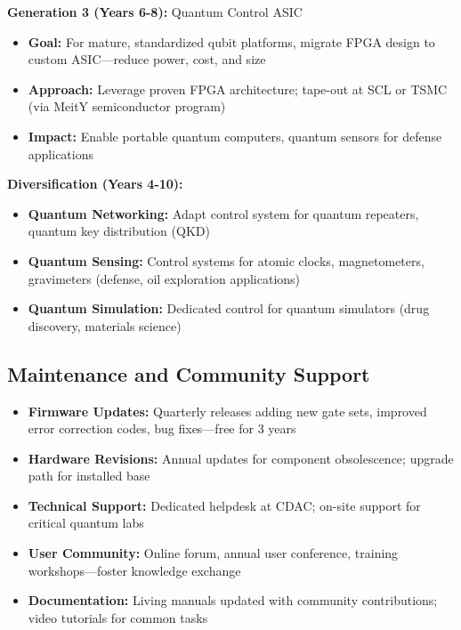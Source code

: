 \documentclass[12pt,a4paper]{article}
\begin{document}
\begin{enumerate}[leftmargin=*]
\textbf{Generation 3 (Years 6-8):} Quantum Control ASIC
\begin{itemize}[leftmargin=*]
    \item \textbf{Goal:} For mature, standardized qubit platforms, migrate FPGA design to custom ASIC—reduce power, cost, and size
    \item \textbf{Approach:} Leverage proven FPGA architecture; tape-out at SCL or TSMC (via MeitY semiconductor program)
    \item \textbf{Impact:} Enable portable quantum computers, quantum sensors for defense applications
\end{itemize}

\textbf{Diversification (Years 4-10):}
\begin{itemize}[leftmargin=*]
    \item \textbf{Quantum Networking:} Adapt control system for quantum repeaters, quantum key distribution (QKD)
    \item \textbf{Quantum Sensing:} Control systems for atomic clocks, magnetometers, gravimeters (defense, oil exploration applications)
    \item \textbf{Quantum Simulation:} Dedicated control for quantum simulators (drug discovery, materials science)
\end{itemize}

\subsection{Maintenance and Community Support}

\begin{itemize}[leftmargin=*]
    \item \textbf{Firmware Updates:} Quarterly releases adding new gate sets, improved error correction codes, bug fixes—free for 3 years
    \item \textbf{Hardware Revisions:} Annual updates for component obsolescence; upgrade path for installed base
    \item \textbf{Technical Support:} Dedicated helpdesk at CDAC; on-site support for critical quantum labs
    \item \textbf{User Community:} Online forum, annual user conference, training workshops—foster knowledge exchange
    \item \textbf{Documentation:} Living manuals updated with community contributions; video tutorials for common tasks
\end{itemize}


\end{enumerate}
\end{document}
